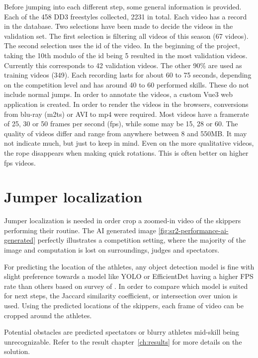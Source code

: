 Before jumping into each different step, some general information is provided. Each of the 458 DD3 freestyles collected, 2231 in total. Each video has a record in the database. Two selections have been made to decide the videos in the validation set. The first selection is filtering all videos of this season (67 videos). The second selection uses the id of the video. In the beginning of the project, taking the 10th modulo of the id being 5 resulted in the most validation videos. Currently this corresponds to 42 validation videos. The other 90\% are used as training videos (349).
Each recording lasts for about 60 to 75 seconds, depending on the competition level and has around 40 to 60 performed skills. These do not include normal jumps. In order to annotate the videos, a custom Vue3 web application is created. In order to render the videos in the browsers, conversions from blu-ray (m2ts) or AVI to mp4 were required. Most videos have a framerate of 25, 30 or 50 frames per second (fps), while some may be 15, 28 or 60.
The quality of videos differ and range from anywhere between 8 and 550MB. It may not indicate much, but just to keep in mind. Even on the more qualitative videos, the rope disappears when making quick rotations. This is often better on higher fps videos.

\section{Jumper localization}

Jumper localization is needed in order crop a zoomed-in video of the skippers performing their routine. The AI generated image \ref{fig:sr2-performance-ai-generated} perfectly illustrates a competition setting, where the majority of the image and computation is lost on surroundings, judges and spectators.

For predicting the location of the athletes, any object detection model is fine with slight preference towards a model like YOLO or EfficientDet having a higher FPS rate than others based on survey of \textcite{Zaidi_2021}. In order to compare which model is suited for next steps, the Jaccard similarity coefficient, or intersection over union is used. 
Using the predicted locations of the skippers, each frame of video can be cropped around the athletes.

Potential obstacles are predicted spectators or blurry athletes mid-skill being unrecognizable. Refer to the result chapter~\ref{ch:results} for more details on the solution.

